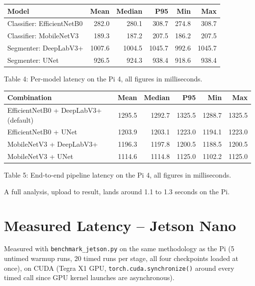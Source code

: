 \documentclass[11pt]{article}
\begin{document}
\begin{center}
\begin{tabular}{lrrrrr}
\toprule
Model & Mean & Median & P95 & Min & Max \\
\midrule
Classifier: EfficientNetB0 & 282.0 & 280.1 & 308.7 & 274.8 & 308.7 \\
Classifier: MobileNetV3 & 189.3 & 187.2 & 207.5 & 186.2 & 207.5 \\
Segmenter: DeepLabV3+ & 1007.6 & 1004.5 & 1045.7 & 992.6 & 1045.7 \\
Segmenter: UNet & 926.5 & 924.3 & 938.4 & 918.6 & 938.4 \\
\bottomrule
\end{tabular}
\end{center}
\begin{center}\small Table 4: Per-model latency on the Pi 4, all figures in milliseconds.\end{center}

\begin{center}
\begin{tabular}{lrrrrr}
\toprule
Combination & Mean & Median & P95 & Min & Max \\
\midrule
EfficientNetB0 + DeepLabV3+ (default) & 1295.5 & 1292.7 & 1325.5 & 1288.7 & 1325.5 \\
EfficientNetB0 + UNet & 1203.9 & 1203.1 & 1223.0 & 1194.1 & 1223.0 \\
MobileNetV3 + DeepLabV3+ & 1196.3 & 1197.8 & 1200.5 & 1188.5 & 1200.5 \\
MobileNetV3 + UNet & 1114.6 & 1114.8 & 1125.0 & 1102.2 & 1125.0 \\
\bottomrule
\end{tabular}
\end{center}
\begin{center}\small Table 5: End-to-end pipeline latency on the Pi 4, all figures in milliseconds.\end{center}

A full analysis, upload to result, lands around 1.1 to 1.3 seconds on the Pi.

\section{Measured Latency -- Jetson Nano}
\label{sec:jetson-latency}

Measured with \texttt{benchmark\_jetson.py} on the same methodology as the Pi (5 untimed
warmup runs, 20 timed runs per stage, all four checkpoints loaded at once), on CUDA
(Tegra X1 GPU, \texttt{torch.cuda.synchronize()} around every timed call since GPU kernel
launches are asynchronous).
\end{document}
